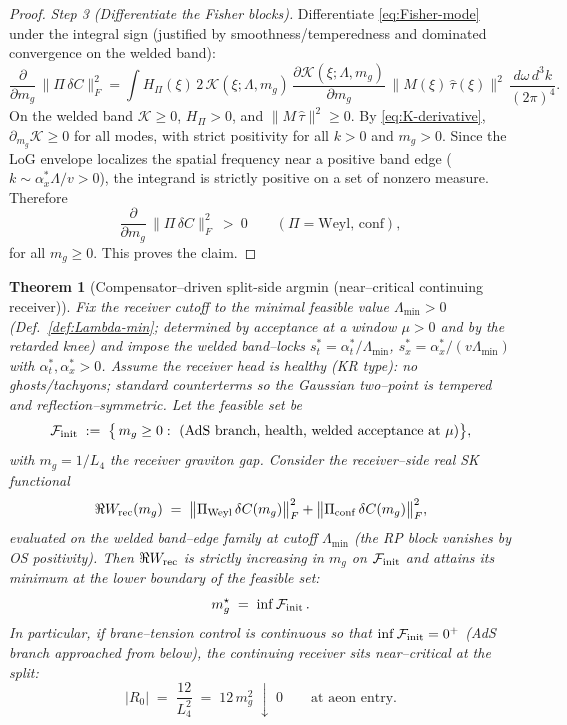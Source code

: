 \documentclass[10pt]{article}
\theoremstyle{definition}
\theoremstyle{plain}
\newtheorem{theorem}{Theorem}[section]
\begin{document}
\begin{proof}
\emph{Step 3 (Differentiate the Fisher blocks).}
Differentiate \eqref{eq:Fisher-mode} under the integral sign (justified by smoothness/temperedness and dominated
convergence on the welded band):
\[
\frac{\partial}{\partial m_g}\,\big\|\Pi\,\delta C\big\|_F^2
=\int H_\Pi(\xi)\,2\,\mathcal K(\xi;\Lambda,m_g)\,\frac{\partial\mathcal K(\xi;\Lambda,m_g)}{\partial m_g}\,
\Big\|M(\xi)\,\widehat{\tau}(\xi)\Big\|^2\,\frac{d\omega\,d^3k}{(2\pi)^4}.
\]
On the welded band $\mathcal K\ge 0$, $H_\Pi>0$, and $\|M\,\widehat{\tau}\|^2\ge 0$. By \eqref{eq:K-derivative},
$\partial_{m_g}\mathcal K\ge 0$ for all modes, with strict positivity for all $k>0$ and $m_g>0$. Since the
LoG envelope localizes the spatial frequency near a positive band edge ($k\sim \alpha_x^{*}\Lambda/v>0$),
the integrand is strictly positive on a set of nonzero measure. Therefore
\[
\frac{\partial}{\partial m_g}\,\big\|\Pi\,\delta C\big\|_F^2\ >\ 0\qquad(\Pi=\text{Weyl, conf}),
\]
for all $m_g\ge 0$. This proves the claim.
\end{proof}

\begin{theorem}[Compensator--driven split-side argmin (near--critical continuing receiver)]\label{thm:init-argmin}
Fix the receiver cutoff to the minimal feasible value $\Lambda_{\min}>0$ (Def.~\ref{def:Lambda-min};
determined by acceptance at a window $\mu>0$ and by the retarded knee) and impose the welded band–locks
$s_t^{*}=\alpha_t^{*}/\Lambda_{\min}$,
$s_x^{*}=\alpha_x^{*}/(v\Lambda_{\min})$ with $\alpha_t^{*},\alpha_x^{*}>0$. Assume the receiver head is
healthy (KR type): no ghosts/tachyons; standard counterterms so the
Gaussian two–point is tempered and reflection–symmetric. Let the feasible set be
\[
\mathcal F_{\rm init}\;:=\;\big\{\,m_g\ge 0:\ \text{(AdS branch, health, welded acceptance at }\mu\text{)}\big\},
\]
with $m_g=1/L_4$ the receiver graviton gap. Consider the receiver–side real SK functional
\[
\Re W_{\rm rec}(m_g)\;=\;\big\|\Pi_{\rm Weyl}\,\delta C(m_g)\big\|_{F}^2
+\big\|\Pi_{\rm conf}\,\delta C(m_g)\big\|_{F}^2,
\]
evaluated on the welded band–edge family at cutoff $\Lambda_{\min}$ (the RP block vanishes by OS positivity).
Then $\Re W_{\rm rec}$ is strictly increasing in $m_g$ on $\mathcal F_{\rm init}$ and attains its minimum at the
\emph{lower boundary} of the feasible set:
\[
m_g^\star\;=\;\inf \mathcal F_{\rm init}\,.
\]
In particular, if brane--tension control is continuous so that $\inf\mathcal F_{\rm init}=0^+$ (AdS
branch approached from below), the continuing receiver sits \emph{near--critical} at the split:
\[
|R_0|\;=\;\frac{12}{L_4^2}\;=\;12\,m_g^2\;\downarrow\; 0\qquad \text{at aeon entry.}
\]
\end{theorem}
\end{document}
